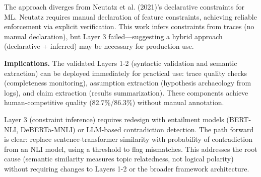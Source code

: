 The approach diverges from Neutatz et al. (2021)'s declarative constraints for ML. Neutatz requires manual declaration of feature constraints, achieving reliable enforcement via explicit verification. This work infers constraints from traces (no manual declaration), but Layer 3 failed---suggesting a hybrid approach (declarative + inferred) may be necessary for production use.

\textbf{Implications.} The validated Layers 1-2 (syntactic validation and semantic extraction) can be deployed immediately for practical use: trace quality checks (completeness monitoring), assumption extraction (hypothesis archaeology from logs), and claim extraction (results summarization). These components achieve human-competitive quality (82.7\%/86.3\%) without manual annotation.

Layer 3 (constraint inference) requires redesign with entailment models (BERT-NLI, DeBERTa-MNLI) or LLM-based contradiction detection. The path forward is clear: replace sentence-transformer similarity with probability of contradiction from an NLI model, using a threshold to flag mismatches. This addresses the root cause (semantic similarity measures topic relatedness, not logical polarity) without requiring changes to Layers 1-2 or the broader framework architecture.
